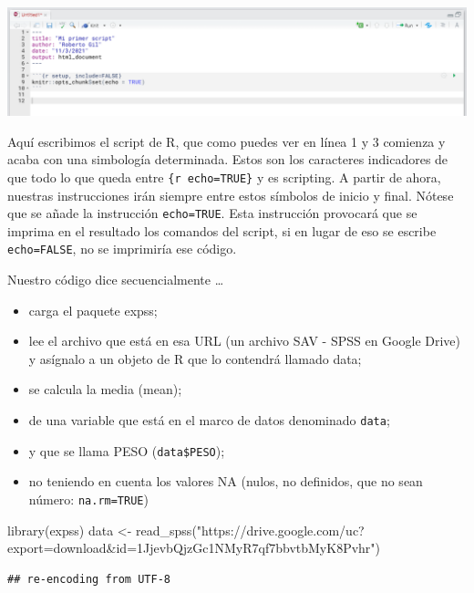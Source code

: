 \documentclass[
]{book}
\newenvironment{Shaded}{\begin{snugshade}}{\end{snugshade}}
\newcommand{\FunctionTok}[1]{\textcolor[rgb]{0.00,0.00,0.00}{#1}}
\newcommand{\NormalTok}[1]{#1}
\newcommand{\OtherTok}[1]{\textcolor[rgb]{0.56,0.35,0.01}{#1}}
\newcommand{\StringTok}[1]{\textcolor[rgb]{0.31,0.60,0.02}{#1}}
\providecommand{\tightlist}{%
  \setlength{\itemsep}{0pt}\setlength{\parskip}{0pt}}
\begin{document}
\includegraphics{data/RS09.png}

Aquí escribimos el script de R, que como puedes ver en línea 1 y 3 comienza y acaba con una simbología determinada. Estos son los caracteres indicadores de que todo lo que queda entre \texttt{\textasciigrave{}\textasciigrave{}\textasciigrave{}\{r\ echo=TRUE\}} y \texttt{\textasciigrave{}\textasciigrave{}\textasciigrave{}} es scripting. A partir de ahora, nuestras instrucciones irán siempre entre estos símbolos de inicio y final. Nótese que se añade la instrucción \texttt{echo=TRUE}. Esta instrucción provocará que se imprima en el resultado los comandos del script, si en lugar de eso se escribe \texttt{echo=FALSE}, no se imprimiría ese código.

Nuestro código dice secuencialmente \ldots{}

\begin{itemize}
\tightlist
\item
  carga el paquete expss;
\item
  lee el archivo que está en esa URL (un archivo SAV - SPSS en Google Drive) y asígnalo a un objeto de R que lo contendrá llamado data;
\item
  se calcula la media (mean);
\item
  de una variable que está en el marco de datos denominado \texttt{data};
\item
  y que se llama PESO (\texttt{data\$PESO});
\item
  no teniendo en cuenta los valores NA (nulos, no definidos, que no sean número: \texttt{na.rm=TRUE})
\end{itemize}

\begin{Shaded}
\begin{Highlighting}[]
\FunctionTok{library}\NormalTok{(expss)}
\NormalTok{data }\OtherTok{\textless{}{-}} \FunctionTok{read\_spss}\NormalTok{(}\StringTok{"https://drive.google.com/uc?export=download\&id=1JjevbQjzGc1NMyR7qf7bbvtbMyK8Pvhr"}\NormalTok{)}
\end{Highlighting}
\end{Shaded}

\begin{verbatim}
## re-encoding from UTF-8
\end{verbatim}
\end{document}
